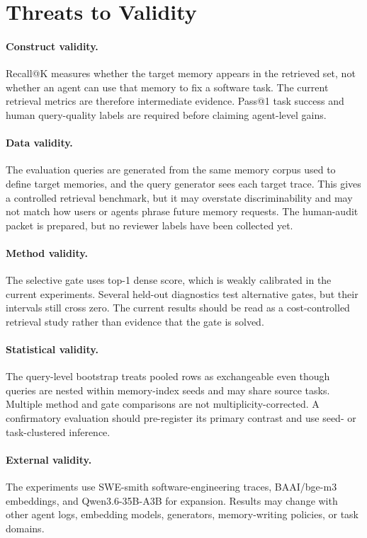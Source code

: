 \documentclass[10pt]{article}
\begin{document}
\section{Threats to Validity}
\paragraph{Construct validity.}
Recall@K measures whether the target memory appears in the retrieved set, not
whether an agent can use that memory to fix a software task. The current
retrieval metrics are therefore intermediate evidence. Pass@1 task success and
human query-quality labels are required before claiming agent-level gains.

\paragraph{Data validity.}
The evaluation queries are generated from the same memory corpus used to define
target memories, and the query generator sees each target trace. This gives a
controlled retrieval benchmark, but it may overstate discriminability and may not
match how users or agents phrase future memory requests. The human-audit packet
is prepared, but no reviewer labels have been collected yet.

\paragraph{Method validity.}
The selective gate uses top-1 dense score, which is weakly calibrated in the
current experiments. Several held-out diagnostics test alternative gates, but
their intervals still cross zero. The current results should be read as a
cost-controlled retrieval study rather than evidence that the gate is solved.

\paragraph{Statistical validity.}
The query-level bootstrap treats pooled rows as exchangeable even though queries
are nested within memory-index seeds and may share source tasks. Multiple method
and gate comparisons are not multiplicity-corrected. A confirmatory evaluation
should pre-register its primary contrast and use seed- or task-clustered inference.

\paragraph{External validity.}
The experiments use SWE-smith software-engineering traces, BAAI/bge-m3
embeddings, and Qwen3.6-35B-A3B for expansion. Results may change with other
agent logs, embedding models, generators, memory-writing policies, or task
domains.
\end{document}

